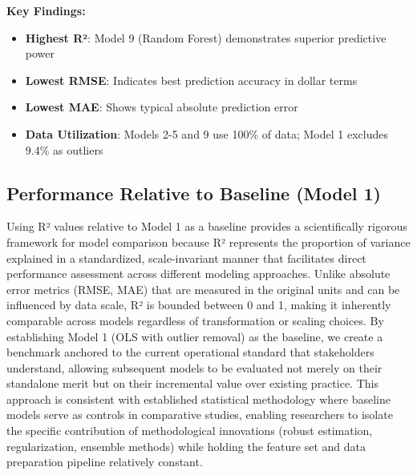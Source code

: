 \textbf{Key Findings:}
\begin{itemize}
    \item \textbf{Highest R²}: Model 9 (Random Forest) demonstrates superior predictive power
    \item \textbf{Lowest RMSE}: Indicates best prediction accuracy in dollar terms
    \item \textbf{Lowest MAE}: Shows typical absolute prediction error
    \item \textbf{Data Utilization}: Models 2-5 and 9 use 100\% of data; Model 1 excludes 9.4\% as outliers
\end{itemize}


\subsection{Performance Relative to Baseline (Model 1)}

Using R² values relative to Model 1 as a baseline provides a scientifically rigorous framework for model comparison because R² represents the proportion of variance explained in a standardized, scale-invariant manner that facilitates direct performance assessment across different modeling approaches. Unlike absolute error metrics (RMSE, MAE) that are measured in the original units and can be influenced by data scale, R² is bounded between 0 and 1, making it inherently comparable across models regardless of transformation or scaling choices. By establishing Model 1 (OLS with outlier removal) as the baseline, we create a benchmark anchored to the current operational standard that stakeholders understand, allowing subsequent models to be evaluated not merely on their standalone merit but on their incremental value over existing practice. This approach is consistent with established statistical methodology where baseline models serve as controls in comparative studies, enabling researchers to isolate the specific contribution of methodological innovations (robust estimation, regularization, ensemble methods) while holding the feature set and data preparation pipeline relatively constant.

